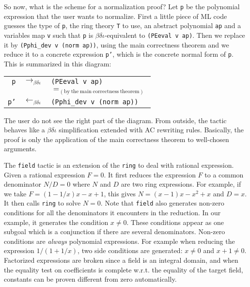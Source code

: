 So now, what is the scheme for a normalization proof? Let \texttt{p}
be the polynomial expression that the user wants to normalize. First a
little piece of ML code guesses the type of \texttt{p}, the ring
theory \texttt{T} to use, an abstract polynomial \texttt{ap} and a
variables map \texttt{v} such that \texttt{p} is
$\beta\delta\iota$-equivalent to \verb|(PEeval v ap)|. Then we
replace it by \verb|(Pphi_dev v (norm ap))|, using the
main correctness theorem and we reduce it to a concrete expression
\texttt{p'}, which is the concrete normal form of
\texttt{p}. This is summarized in this diagram:
\begin{center}
\begin{tabular}{rcl}
\texttt{p} & $\rightarrow_{\beta\delta\iota}$
   & \texttt{(PEeval v ap)} \\
 & & $=_{\mathrm{(by\ the\ main\ correctness\ theorem)}}$ \\
\texttt{p'}
   & $\leftarrow_{\beta\delta\iota}$
   & \texttt{(Pphi\_dev v (norm ap))}
\end{tabular}
\end{center}
The user do not see the right part of the diagram.
From outside, the tactic behaves like a
$\beta\delta\iota$ simplification extended with AC rewriting rules.
Basically, the proof is only the application of the main
correctness theorem to well-chosen arguments.




The {\tt field} tactic is  an extension of the {\tt ring} to deal with
rational expression. Given a rational expression $F=0$. It first reduces the
expression $F$ to a common denominator $N/D= 0$ where $N$ and $D$ are two ring
expressions.
For example, if we take $F = (1 - 1/x) x - x + 1$, this gives
$ N= (x -1)  x - x^2 + x$ and $D= x$. It then calls {\tt ring}
to solve $N=0$. Note that {\tt field} also generates non-zero conditions
for all the denominators it encounters in the reduction.
In our example, it generates the condition $x \neq 0$. These
conditions appear as one subgoal which is a conjunction if there are
several denominators.
Non-zero conditions are {\it always} polynomial expressions. For example
when reducing the expression $1/(1 + 1/x)$, two side conditions are
generated: $x\neq 0$ and $x + 1 \neq 0$. Factorized expressions are
broken since a field is an integral domain, and when the equality test
on coefficients is complete w.r.t. the equality of the target field,
constants can be proven different from zero automatically.


